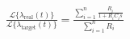 \documentclass[convert={outext=.svg,density=750}]{standalone}
\begin{document}
$
    \frac{\mathcal{L}\{\lambda_{\text{real}}(t)\}}{\mathcal{L}\{\lambda_{\text{target}}(t)\}}=
    \frac{\sum\limits_{i=1}^n \frac{R_i}{1+R_i C_i s}}{\sum\limits_{i=1}^n R_i}
$
\end{document}
